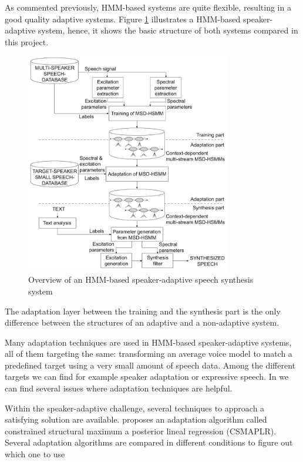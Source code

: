 As commented previously, HMM-based systems are quite flexible, resulting in a good quality adaptive systems.
%
Figure \ref{fig:hmm_system_adapt_overview} illustrates a HMM-based speaker-adaptive system, hence, it shows the basic structure of both systems compared in this project.

\begin{figure}[!htb]
\begin{centering}
\includegraphics[width=0.8\textwidth]{images/hmm_based_system_adapt_overview.jpg}
\caption{Overview of an HMM-based speaker-adaptive speech synthesis system \cite{yamagishi2009}}
\label{fig:hmm_system_adapt_overview}
\end{centering}
\end{figure}

The adaptation layer between the training and the synthesis part is the only difference between the structures of an adaptive and a non-adaptive system.
%

Many adaptation techniques are used in HMM-based speaker-adaptive systems, all of them targeting the same: transforming an average voice model to match a predefined target using a very small amount of speech data.
%
Among the different targets we can find for example speaker adaptation or expressive speech.
%
In \cite{tokuda13} we can find several issues where adaptation techniques are helpful. 

Within the speaker-adaptive challenge, several techniques to approach a satisfying solution are available. 
%
\cite{yamagishi2009} proposes an adaptation algorithm called constrained structural maximum a posterior lineal regression (CSMAPLR).
%
Several adaptation algorithms are compared in different conditions to figure out which one to use 